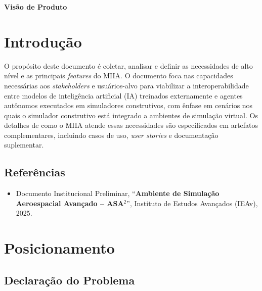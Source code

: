 \begin{center}
    \textbf{\Huge{Visão de Produto}}
\end{center}

\section{Introdução}

O propósito deste documento é coletar, analisar e definir as necessidades de alto nível e as principais \emph{features} do MIIA. O documento foca nas capacidades necessárias aos \emph{stakeholders} e usuários-alvo para viabilizar a interoperabilidade entre modelos de inteligência artificial (IA) treinados externamente e agentes autônomos executados em simuladores construtivos, com ênfase em cenários nos quais o simulador construtivo está integrado a ambientes de simulação virtual. Os detalhes de como o MIIA atende essas necessidades são especificados em artefatos complementares, incluindo casos de uso, \emph{user stories} e documentação suplementar.

\subsection{Referências}

\begin{itemize}
    \item Documento Institucional Preliminar, ``\textbf{Ambiente de Simulação Aeroespacial Avançado -- ASA$^{2}$}'', Instituto de Estudos Avançados (IEAv), 2025.
\end{itemize}

\newpage

\section{Posicionamento}

\subsection{Declaração do Problema}

